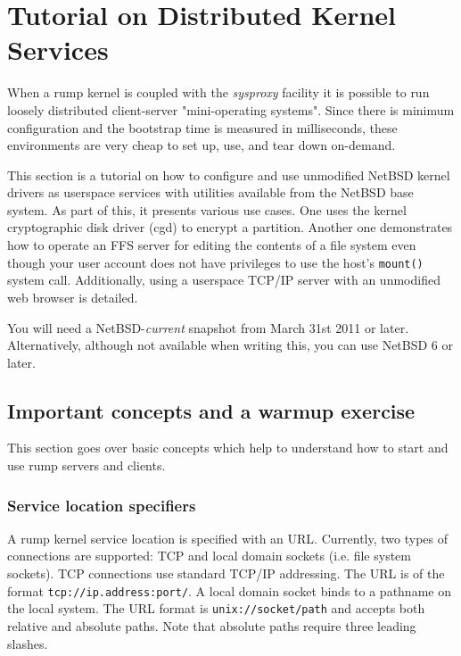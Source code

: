 
\section{Tutorial on Distributed Kernel Services}

When a rump kernel is coupled with the \textit{sysproxy} facility
it is possible to run loosely distributed client-server "mini-operating
systems".  Since there is minimum configuration and the bootstrap
time is measured in milliseconds, these environments are very cheap
to set up, use, and tear down on-demand.

This section is a tutorial on how to configure and use unmodified
NetBSD kernel drivers as userspace services with utilities available
from the NetBSD base system.  As part of this, it presents various
use cases.  One uses the kernel cryptographic disk driver (cgd) to
encrypt a partition.  Another one demonstrates how to operate an
FFS server for editing the contents of a file system even though
your user account does not have privileges to use the host's
\verb+mount()+ system call.  Additionally, using a userspace TCP/IP
server with an unmodified web browser is detailed.

You will need a NetBSD-\textit{current} snapshot from March 31st
2011 or later.  Alternatively, although not available when writing
this, you can use NetBSD 6 or later.

\subsection{Important concepts and a warmup exercise}

This section goes over basic concepts which help to understand how to
start and use rump servers and clients.

\subsubsection{Service location specifiers}

A rump kernel service location is specified with an URL.  Currently,
two types of connections are supported: TCP and local domain sockets (i.e.
file system sockets).  TCP connections use standard TCP/IP addressing.
The URL is of the format \verb+tcp://ip.address:port/+.
A local domain socket binds to a pathname on the local system.
The URL format is \verb+unix://socket/path+ and accepts
both relative and absolute paths.  Note that absolute paths require three
leading slashes.

